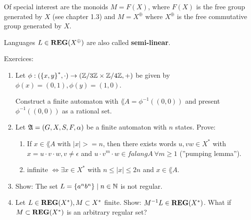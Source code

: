 Of special interest are the monoids $M = F(X)$, where $F(X)$ is the free group
generated by $X$ (see chapter 1.3) and $M = X^\oplus$ where $X^\oplus$ is the
free commutative group generated by $X$.

Languages $L \in \mbox{{\bf REG}}(X^\oplus)$ are also called {\bf semi-linear}.

Exercices:
\begin{enumerate}
  \item Let $\phi : (\mbox{$\{x, y\}$}^*, \cdot) \to (\mathbb{Z} / 3 \mathbb{Z}
  \times \mathbb{Z} / 4 \mathbb{Z}, +)$ be given by $\phi(x) = (0,1), \phi(y) = (1,0)$.
  
  Construct a finite automaton  with $\lang{A} = \phi^{-1}((0,0))$ and
  present $\phi^{-1}((0,0))$ as a rational set.
  
  \item Let $\mbox{$\mathfrak{A}$} = (G, X, S, F, \alpha)$ be a finite automaton with $n$
  states. Prove:
  \begin{enumerate}
    \item If $x \in \lang{A}$ with $|x| >= n$, then there exists words $u, v
    w \in X^*$ with $x = u \cdot v \cdot w, v \neq \epsilon$ and $u \cdot v^m
    \cdot w \in falang{A}\ \forall m \geq 1$ (''pumping lemma'').
    \item {} infinite $\Leftrightarrow \exists x \in X^*$ with $n \leq
    |x| \leq 2n$ and $x \in \lang{A}$.
   \end {enumerate}

	\item Show: The set $L = \mbox{$\{a^n b^n\}$} \mid n \in \mathbb{N}$ is not
	regular.
	
	\item Let $L \in \mbox{{\bf REG}}(X^*), M \subset X^*$ finite. Show: $M^{-1}L \in \mbox{{\bf REG}}(X^*)$.
	What if $M \subset \mbox{{\bf REG}}(X^*)$ is an arbitrary regular set?
\end{enumerate}

